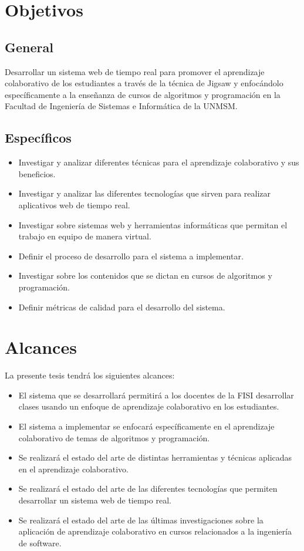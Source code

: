 \section{Objetivos}
\subsection{General}
Desarrollar un sistema web de tiempo real para promover el aprendizaje colaborativo de los estudiantes a través de la técnica de Jigsaw y enfocándolo específicamente a la enseñanza de cursos de algoritmos y programación en la Facultad de Ingeniería de Sistemas e Informática de la UNMSM.
\subsection{Específicos}
\begin{itemize}
  \item Investigar y analizar diferentes técnicas para el aprendizaje colaborativo y sus beneficios.
  \item Investigar y analizar las diferentes tecnologías que sirven para realizar aplicativos web de tiempo real.
  \item Investigar sobre sistemas web y herramientas informáticas que permitan el trabajo en equipo de manera virtual.
  \item Definir el proceso de desarrollo para el sistema a implementar.
  \item Investigar sobre los contenidos que se dictan en cursos de algoritmos y programación.
  \item Definir métricas de calidad para el desarrollo del sistema.
\end{itemize}

\section{Alcances}
La presente tesis tendrá los siguientes alcances:
\begin{itemize}
  \item El sistema que se desarrollará permitirá a los docentes de la FISI desarrollar clases usando un enfoque de aprendizaje colaborativo en los estudiantes.
  \item El sistema a implementar se enfocará específicamente en el aprendizaje  colaborativo de temas de algoritmos y programación.
  \item Se realizará el estado del arte de distintas herramientas y técnicas aplicadas en el aprendizaje colaborativo.
  \item Se realizará el estado del arte de las diferentes tecnologías que permiten desarrollar un sistema web de tiempo real.
  \item Se realizará el estado del arte de las últimas investigaciones sobre la aplicación de aprendizaje colaborativo en cursos relacionados a la ingeniería de software.
\end{itemize}

